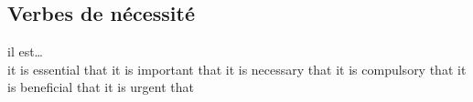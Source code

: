 \subsection*{Verbes de nécessité}

il est\ldots\\
   {it is essential that}
   {it is important that}
   {it is necessary that}
   {it is compulsory that}
    {it is beneficial that}
   {it is urgent that}
